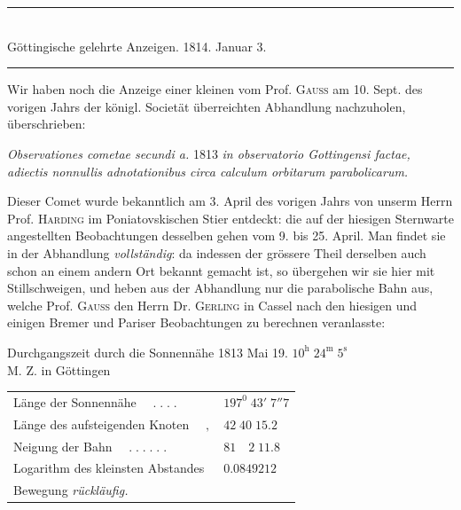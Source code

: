 \clearpage
{}
\begin{center}\rule{.75\textwidth}{.3pt}\\
Göttingische gelehrte Anzeigen. 1814. Januar 3.\\
\rule{.75\textwidth}{.3pt}\end{center}
Wir haben noch die Anzeige einer kleinen vom Prof. \textsc{Gauss} am 10. Sept.
des vorigen Jahrs der königl. Societät überreichten Abhandlung nachzuholen,
überschrieben:
\begin{center}
\textit{Observationes cometae secundi a.} 1813 \textit{in observatorio Gottingensi factae, adiectis
nonnullis adnotationibus circa calculum orbitarum parabolicarum.}
\end{center}
Dieser Comet wurde bekanntlich am 3. April des vorigen Jahrs von unserm
Herrn Prof. \textsc{Harding} im Poniatovskischen Stier entdeckt: die auf der hiesigen
Sternwarte angestellten Beobachtungen desselben gehen vom 9. bis 25. April.
Man findet sie in der Abhandlung \textit{vollständig}: da indessen der grössere Theil derselben
auch schon an einem andern Ort bekannt gemacht ist, so übergehen wir
sie hier mit Stillschweigen, und heben aus der Abhandlung nur die parabolische
Bahn aus, welche Prof. \textsc{Gauss} den Herrn Dr. \textsc{Gerling} in Cassel nach den hiesigen
und einigen Bremer und Pariser Beobachtungen zu berechnen veranlasste:
\begin{center}\small
Durchgangszeit durch die Sonnennähe 1813 Mai 19. $10^{\mathrm h}\;24^{\mathrm m}\;5^{\mathrm s}$\\
M. Z. in Göttingen
\end{center}
\begin{center}\small
\setlength{\tabcolsep}{3pt}
\begin{tabular}{ll}
Länge der Sonnennähe $\quad.\;.\;.\;.$ & $197^0\;43'\;7''7$\\
Länge des aufsteigenden Knoten $\quad,$ & $42\;40\;15.2$\\
Neigung der Bahn $\quad.\;.\;.\;.\;.\;.$ & $81\quad2\;11.8$\\
Logarithm des kleinsten Abstandes & $0.0849212$\\
\multicolumn{2}{l}{Bewegung \textit{rückläufig.}}
\end{tabular}\end{center}

